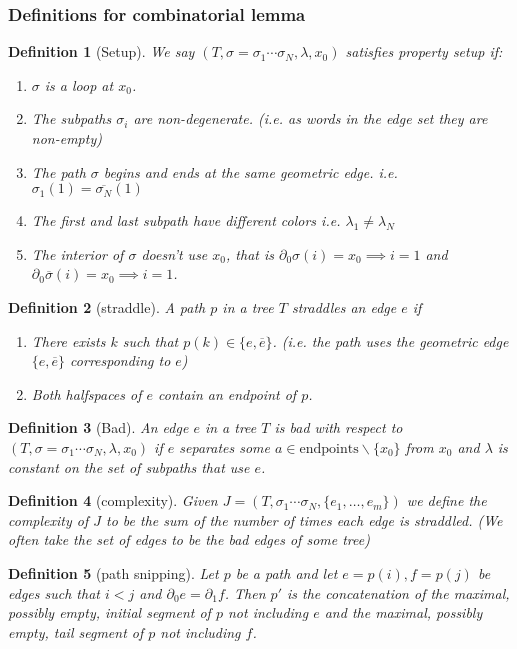 \documentclass{article}
\theoremstyle{mystyle}
\newtheorem{defn}{Definition}
\theoremstyle{remark}
\begin{document}
\subsubsection{Definitions for combinatorial lemma}
\begin{defn}
    [Setup]
    \label{def:setup} 
    We say \((T, \sigma = \sigma_{1} \cdots \sigma_{N} , \lambda, x_{0} )\) satisfies property {\em setup} if: 
    \begin{enumerate}
        \item \label{item:loop} \(\sigma\) is a loop at \(x_{0}\).
        \item \label{item:nondegen} The subpaths \(\sigma_{i}\) are non-degenerate. (i.e. as words in the edge set they are non-empty)
        \item \label{item:sharededge} The path \(\sigma\) begins and ends at the same geometric edge. i.e. \(\sigma_{1} (1) = \overline{ \sigma_{N}} (1) \) 
        \item \label{item:colors} The first and last subpath have different colors i.e. \(\lambda_{1} \neq \lambda_{N}\) 
        \item \label{item:interior} The interior of \(\sigma\) doesn't use \(x_{0}\), that is \(\partial_{0} \sigma (i) = x_{0} \implies i=1\) and \(\partial_{0} \overline\sigma (i)=x_{0} \implies i=1\).
    \end{enumerate}
\end{defn}
\begin{defn}
	[straddle]
	A path \(p\) in a tree \(T\) {\em straddles} an edge \(e\) if
	\begin{enumerate}
		\item There exists \(k\) such that \(p(k) \in  \{e, \overline{e}\}\). (i.e. the path uses the geometric edge \(\{e , \overline{e}\}\) corresponding to  \(e\))
		\item Both halfspaces of \(e\) contain an endpoint of \(p\).
	\end{enumerate}
\end{defn}
\begin{defn}
    [Bad]
    An edge \(e\) in a tree \(T\) is {\em bad} with respect to \((T, \sigma = \sigma_{1} \cdots \sigma_{N} , \lambda,x_{0} )\) if \(e\) separates some \(a \in \text{endpoints} \smallsetminus \{x_{0} \}\) from \(x_{0}\) and \(\lambda\) is constant on the set of subpaths that use \(e\).
\end{defn}
\begin{defn}
	[complexity]
    \label{def:complexity} 
    Given \(J=(T, \sigma_{1} \cdots \sigma_{N} , \{e_{1} , \ldots, e_{m}\})\) we define the {\em complexity} of \(J\) to be the sum of the number of times each edge is straddled. (We often take the set of edges to be the bad edges of some tree)
\end{defn}
\begin{defn}
	[path snipping]
    Let \(p\) be a path and let \(e=p(i), f=p(j)\) be edges such that \(i<j\) and  \(\partial_{0}  e = \partial_{1} f \). Then \(p'\) is the concatenation of the maximal, possibly empty, initial segment of \(p\) not including \(e\) and the maximal, possibly empty, tail segment of \(p\) not including \(f\). 
\end{defn}
\end{document}

